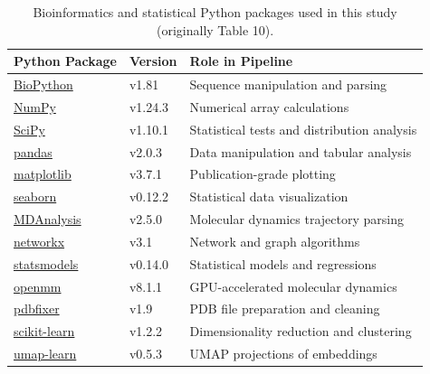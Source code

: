 \documentclass[review,11pt]{article}
\begin{document}
\begin{table}[h!]
\centering
\caption{Bioinformatics and statistical Python packages used in this study (originally Table 10).}
\label{tab:python_packages}
\footnotesize
\begin{tabular}{llp{11cm}}
\toprule
\textbf{Python Package} & \textbf{Version} & \textbf{Role in Pipeline} \\
\midrule
\href{https://biopython.org/}{BioPython} & v1.81 & Sequence manipulation and parsing \\
\href{https://numpy.org/}{NumPy} & v1.24.3 & Numerical array calculations \\
\href{https://scipy.org/}{SciPy} & v1.10.1 & Statistical tests and distribution analysis \\
\href{https://pandas.pydata.org/}{pandas} & v2.0.3 & Data manipulation and tabular analysis \\
\href{https://matplotlib.org/}{matplotlib} & v3.7.1 & Publication-grade plotting \\
\href{https://seaborn.pydata.org/}{seaborn} & v0.12.2 & Statistical data visualization \\
\href{https://www.mdanalysis.org/}{MDAnalysis} & v2.5.0 & Molecular dynamics trajectory parsing \\
\href{https://networkx.org/}{networkx} & v3.1 & Network and graph algorithms \\
\href{https://www.statsmodels.org/}{statsmodels} & v0.14.0 & Statistical models and regressions \\
\href{https://openmm.org/}{openmm} & v8.1.1 & GPU-accelerated molecular dynamics \\
\href{https://github.com/openmm/pdbfixer}{pdbfixer} & v1.9 & PDB file preparation and cleaning \\
\href{https://scikit-learn.org/}{scikit-learn} & v1.2.2 & Dimensionality reduction and clustering \\
\href{https://github.com/lmcinnes/umap}{umap-learn} & v0.5.3 & UMAP projections of embeddings \\
\bottomrule
\end{tabular}
\end{table}
\end{document}
